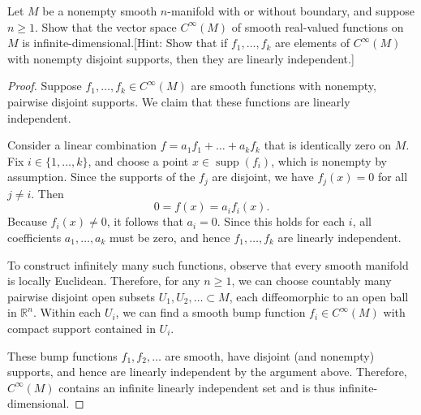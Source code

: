 \begin{problem}
    Let $M$ be a nonempty smooth $n$-manifold with or without boundary, and suppose $n \geq 1$. Show that the vector space $C^\infty(M)$ of smooth real-valued functions on $M$ is infinite-dimensional.[Hint: Show that if $f_1, \dots, f_k$ are elements of $C^\infty(M)$ with nonempty disjoint supports, then they are linearly independent.]
    
    \begin{proof}
        Suppose \( f_1, \dots, f_k \in C^\infty(M) \) are smooth functions with nonempty, pairwise disjoint supports. We claim that these functions are linearly independent.

        Consider a linear combination \( f = a_1 f_1 + \dots + a_k f_k \) that is identically zero on \( M \). Fix \( i \in \{1, \dots, k\} \), and choose a point \( x \in \operatorname{supp}(f_i) \), which is nonempty by assumption. Since the supports of the \( f_j \) are disjoint, we have \( f_j(x) = 0 \) for all \( j \neq i \). Then
        \[
            0 = f(x) = a_i f_i(x).
        \]
        Because \( f_i(x) \neq 0 \), it follows that \( a_i = 0 \). Since this holds for each \( i \), all coefficients \( a_1, \dots, a_k \) must be zero, and hence \( f_1, \dots, f_k \) are linearly independent.

        To construct infinitely many such functions, observe that every smooth manifold is locally Euclidean. Therefore, for any \( n \geq 1 \), we can choose countably many pairwise disjoint open subsets \( U_1, U_2, \dots \subset M \), each diffeomorphic to an open ball in \( \mathbb{R}^n \). Within each \( U_i \), we can find a smooth bump function \( f_i \in C^\infty(M) \) with compact support contained in \( U_i \).

        These bump functions \( f_1, f_2, \dots \) are smooth, have disjoint (and nonempty) supports, and hence are linearly independent by the argument above. Therefore, \( C^\infty(M) \) contains an infinite linearly independent set and is thus infinite-dimensional.
    \end{proof}
\end{problem}

